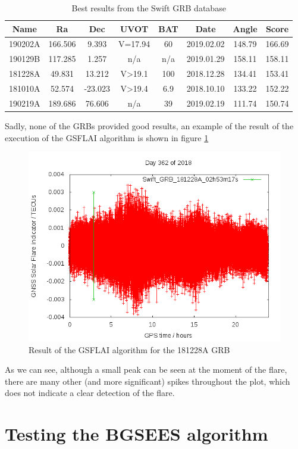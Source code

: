 \begin{table}[h!]
	\centering
	\def\arraystretch{1.2}
	\begin{tabular}{|c c c c c c c c|} 
		\hline
		Name & Ra & Dec & UVOT & BAT & Date & Angle & Score \\
		\hline\hline
		190202A & 166.506 & 9.393 & V=17.94 & 60 & 2019.02.02 & 148.79 & 166.69 \\
		\hline
		190129B & 117.285 & 1.257 & n/a & n/a & 2019.01.29 & 158.11 & 158.11 \\
		\hline
		181228A & 49.831 & 13.212 & V>19.1 & 100 & 2018.12.28 & 134.41 & 153.41 \\
		\hline
		181010A & 52.574 & -23.023 & V>19.4 & 6.9 & 2018.10.10 & 133.22 & 152.22 \\
		\hline
		190219A & 189.686 & 76.606 & n/a & 39 & 2019.02.19 & 111.74 & 150.74 \\
		\hline
	\end{tabular}
	\caption{Best results from the Swift GRB database}
\end{table}

Sadly, none of the GRBs provided good results, an example of the result of the execution of the GSFLAI algorithm is shown in figure \ref{fig:gsflai}

\begin{figure}[!htb]
	\begin{centering}
		\includegraphics[width=0.5\linewidth]{images/swift/gsflai.png}
		\caption{Result of the GSFLAI algorithm for the 181228A GRB}
		\label{fig:gsflai}
	\end{centering}
\end{figure}

As we can see, although a small peak can be seen at the moment of the flare, there are many other (and more significant) spikes throughout the plot, which does not indicate a clear detection of the flare.

\section{Testing the BGSEES algorithm}

